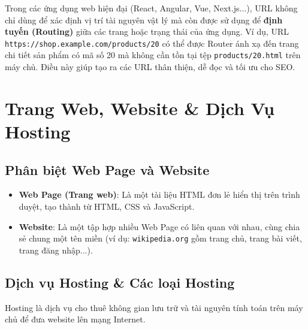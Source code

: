 \documentclass[11pt,oneside]{book}
\newcommand{\codeinline}[1]{\textcolor{accentOrange}{\texttt{#1}}}
\begin{document}
\begin{noteBox}
Trong các ứng dụng web hiện đại (React, Angular, Vue, Next.js...), URL không chỉ dùng để xác định vị trí tài nguyên vật lý mà còn được sử dụng để \textbf{định tuyến (Routing)} giữa các trang hoặc trạng thái của ứng dụng. Ví dụ, URL \codeinline{https://shop.example.com/products/20} có thể được Router ánh xạ đến trang chi tiết sản phẩm có mã số 20 mà không cần tồn tại tệp \codeinline{products/20.html} trên máy chủ. Điều này giúp tạo ra các URL thân thiện, dễ đọc và tối ưu cho SEO.
\end{noteBox}

\section{Trang Web, Website \& Dịch Vụ Hosting}
\label{sec:hosting}

\subsection{Phân biệt Web Page và Website}
\begin{itemize}
    \item \textbf{Web Page (Trang web)}: Là một tài liệu HTML đơn lẻ hiển thị trên trình duyệt, tạo thành từ HTML, CSS và JavaScript.
    \item \textbf{Website}: Là một tập hợp nhiều Web Page có liên quan với nhau, cùng chia sẻ chung một tên miền (ví dụ: \codeinline{wikipedia.org} gồm trang chủ, trang bài viết, trang đăng nhập...).
\end{itemize}

\subsection{Dịch vụ Hosting \& Các loại Hosting}

Hosting là dịch vụ cho thuê không gian lưu trữ và tài nguyên tính toán trên máy chủ để đưa website lên mạng Internet.
\end{document}
